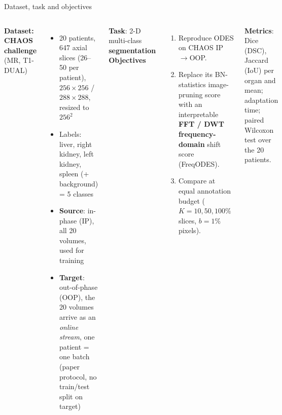 \documentclass[aspectratio=169,10pt]{beamer}
\begin{document}
\begin{frame}{Dataset, task and objectives}
  \begin{columns}[T]
    \textbf{Dataset: CHAOS challenge} \cite{kavur2021chaos} (MR, T1-DUAL)
    \begin{itemize}\small
      \item 20 patients, 647 axial slices (26--50 per patient), $256\times256$ / $288\times288$, resized to $256^2$
      \item Labels: liver, right kidney, left kidney, spleen (+ background) = 5 classes
      \item \textbf{Source}: in-phase (IP), all 20 volumes, used for training
      \item \textbf{Target}: out-of-phase (OOP), the 20 volumes arrive as an \emph{online stream}, one patient = one batch (paper protocol, no train/test split on target)
    \end{itemize}
    \textbf{Task}: 2-D multi-class \textbf{segmentation}\\[2mm]
    \textbf{Objectives}
    \begin{enumerate}\small
      \item Reproduce ODES \cite{islam2025odes} on CHAOS IP$\rightarrow$OOP.
      \item Replace its BN-statistics image-pruning score with an interpretable \textbf{FFT / DWT frequency-domain} shift score (FreqODES).
      \item Compare at equal annotation budget ($K=10,50,100\%$ slices, $b=1\%$ pixels).
    \end{enumerate}
    \textbf{Metrics}: Dice (DSC), Jaccard (IoU) per organ and mean; adaptation time; paired Wilcoxon test over the 20 patients.
  \end{columns}
\end{frame}

\end{document}
